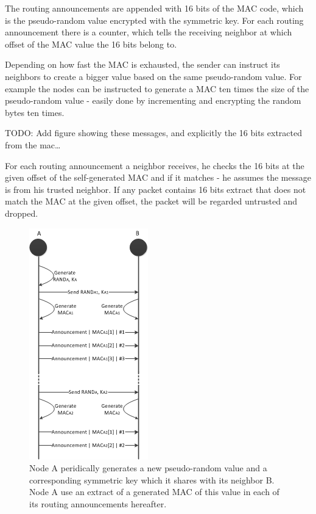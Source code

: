 The routing announcements are appended with 16 bits of the \ac{MAC} code, which
is the pseudo-random value encrypted with the symmetric key. For each routing
announcement there is a counter, which tells the receiving neighbor at which
offset of the \ac{MAC} value the 16 bits belong to.

Depending on how fast the \ac{MAC} is exhausted, the sender can instruct its
neighbors to create a bigger value based on the same pseudo-random value. For
example the nodes can be instructed to generate a \ac{MAC} ten times the size of
the pseudo-random value - easily done by incrementing and encrypting the random
bytes ten times.

TODO: Add figure showing these messages, and explicitly the 16 bits extracted
from the mac\ldots

For each routing announcement a neighbor receives, he checks the 16 bits at the
given offset of the self-generated \ac{MAC} and if it matches - he assumes the
message is from his trusted neighbor. If any packet contains 16 bits extract
that does not match the \ac{MAC} at the given offset, the packet will be
regarded untrusted and dropped.

\begin{figure}[h]
	\centering
  	\includegraphics{images/mac_ogm_msc.png}
  	\caption{Node A peridically generates a new pseudo-random value and a
  	corresponding symmetric key which it shares with its neighbor B. Node A use
  	an extract of a generated MAC of this value in each of its routing
  	announcements hereafter.}
	\label{fig:node_states_authorized}
\end{figure}

